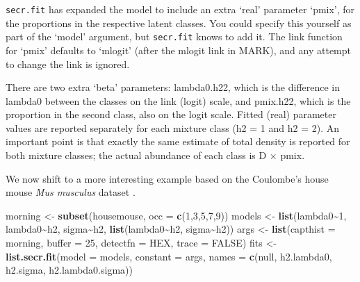 \documentclass[
]{book}
\newenvironment{Shaded}{\begin{snugshade}}{\end{snugshade}}
\newcommand{\AttributeTok}[1]{\textcolor[rgb]{0.13,0.29,0.53}{#1}}
\newcommand{\ConstantTok}[1]{\textcolor[rgb]{0.56,0.35,0.01}{#1}}
\newcommand{\DecValTok}[1]{\textcolor[rgb]{0.00,0.00,0.81}{#1}}
\newcommand{\FunctionTok}[1]{\textcolor[rgb]{0.13,0.29,0.53}{\textbf{#1}}}
\newcommand{\NormalTok}[1]{#1}
\newcommand{\OtherTok}[1]{\textcolor[rgb]{0.56,0.35,0.01}{#1}}
\newcommand{\SpecialCharTok}[1]{\textcolor[rgb]{0.81,0.36,0.00}{\textbf{#1}}}
\newcommand{\StringTok}[1]{\textcolor[rgb]{0.31,0.60,0.02}{#1}}
\begin{document}
\texttt{secr.fit} has expanded the model to include an extra `real' parameter `pmix', for the proportions in the respective latent classes. You could specify this yourself as part of the `model' argument, but \texttt{secr.fit} knows to add it.
The link function for `pmix' defaults to `mlogit' (after the mlogit link in MARK), and any attempt to change the link is ignored.

There are two extra `beta' parameters: lambda0.h22, which is the difference in lambda0 between the classes on the link (logit) scale, and pmix.h22, which is the proportion in the second class, also on the logit scale. Fitted (real) parameter values are reported separately for each mixture class (h2 = 1 and h2 = 2). An important point is that exactly the same estimate of total density is reported for both mixture classes; the actual abundance of each class is D \(\times\) pmix.

We now shift to a more interesting example based on the Coulombe's house mouse \emph{Mus musculus} dataset \citep{obwa78}.

\begin{Shaded}
\begin{Highlighting}[]
\NormalTok{morning }\OtherTok{\textless{}{-}} \FunctionTok{subset}\NormalTok{(housemouse, }\AttributeTok{occ =} \FunctionTok{c}\NormalTok{(}\DecValTok{1}\NormalTok{,}\DecValTok{3}\NormalTok{,}\DecValTok{5}\NormalTok{,}\DecValTok{7}\NormalTok{,}\DecValTok{9}\NormalTok{))}
\NormalTok{models }\OtherTok{\textless{}{-}} \FunctionTok{list}\NormalTok{(lambda0}\SpecialCharTok{\textasciitilde{}}\DecValTok{1}\NormalTok{, lambda0}\SpecialCharTok{\textasciitilde{}}\NormalTok{h2, sigma}\SpecialCharTok{\textasciitilde{}}\NormalTok{h2, }\FunctionTok{list}\NormalTok{(lambda0}\SpecialCharTok{\textasciitilde{}}\NormalTok{h2,}
\NormalTok{    sigma}\SpecialCharTok{\textasciitilde{}}\NormalTok{h2))}
\NormalTok{args }\OtherTok{\textless{}{-}} \FunctionTok{list}\NormalTok{(}\AttributeTok{capthist =}\NormalTok{ morning, }\AttributeTok{buffer =} \DecValTok{25}\NormalTok{, }\AttributeTok{detectfn =} \StringTok{\textquotesingle{}HEX\textquotesingle{}}\NormalTok{, }
    \AttributeTok{trace =} \ConstantTok{FALSE}\NormalTok{)}
\NormalTok{fits }\OtherTok{\textless{}{-}} \FunctionTok{list.secr.fit}\NormalTok{(}\AttributeTok{model =}\NormalTok{ models, }\AttributeTok{constant =}\NormalTok{ args, }\AttributeTok{names =}
    \FunctionTok{c}\NormalTok{(}\StringTok{\textquotesingle{}null\textquotesingle{}}\NormalTok{, }\StringTok{\textquotesingle{}h2.lambda0\textquotesingle{}}\NormalTok{, }\StringTok{\textquotesingle{}h2.sigma\textquotesingle{}}\NormalTok{, }\StringTok{\textquotesingle{}h2.lambda0.sigma\textquotesingle{}}\NormalTok{)) }
\end{Highlighting}
\end{Shaded}
\end{document}
